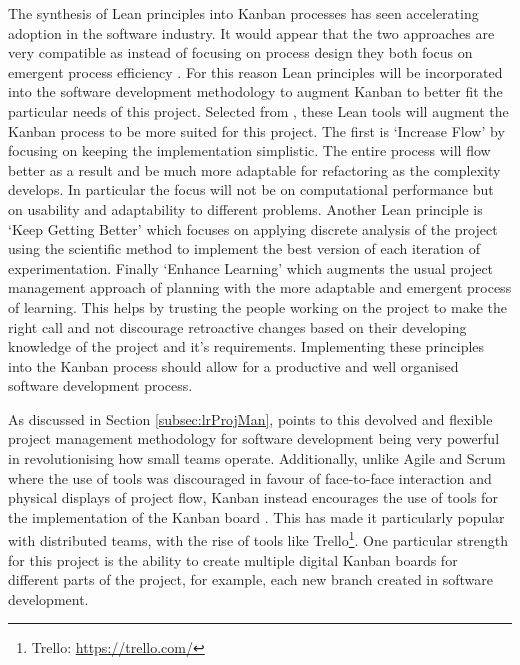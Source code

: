 \documentclass[hidelinks,journal]{IEEEtran}
\begin{document}
The synthesis of Lean principles into Kanban processes has seen accelerating adoption in the software industry. It would appear that the two approaches are very compatible as instead of focusing on process design they both focus on emergent process efficiency \parencite{Ahmad17}. For this reason Lean principles will be incorporated into the software development methodology to augment Kanban to better fit the particular needs of this project. Selected from \textcite{Poppendieck13}, these Lean tools will augment the Kanban process to be more suited for this project. The first is ‘Increase Flow’ by focusing on keeping the implementation simplistic. The entire process will flow better as a result and be much more adaptable for refactoring as the complexity develops. In particular the focus will not be on computational performance but on usability and adaptability to different problems. Another Lean principle is ‘Keep Getting Better’ which focuses on applying discrete analysis of the project using the scientific method to implement the best version of each iteration of experimentation. Finally ‘Enhance Learning’ which augments the usual project management approach of planning with the more adaptable and emergent process of learning. This helps by trusting the people working on the project to make the right call and not discourage retroactive changes based on their developing knowledge of the project and it’s requirements. Implementing these principles into the Kanban process should allow for a productive and well organised software development process.

As discussed in Section \ref{subsec:lrProjMan}, \textcite{Corona13} points to this devolved and flexible project management methodology for software development being very powerful in revolutionising how small teams operate. Additionally, unlike Agile and Scrum where the use of tools was discouraged in favour of face-to-face interaction and physical displays of project flow, Kanban instead encourages the use of tools for the implementation of the Kanban board \parencite{Corona13}. This has made it particularly popular with distributed teams, with the rise of tools like Trello\footnote{Trello: \url{https://trello.com/}}. One particular strength for this project is the ability to create multiple digital Kanban boards for different parts of the project, for example, each new branch created in software development.
\end{document}
